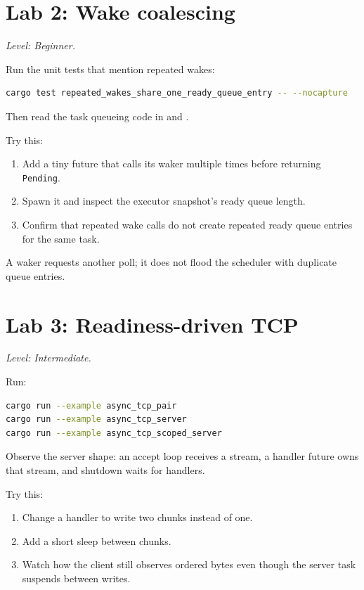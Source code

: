 \section{Lab 2: Wake coalescing}

\textit{Level: Beginner.}

Run the unit tests that mention repeated wakes:

\begin{lstlisting}[language=bash,caption={Wake tests}]
cargo test repeated_wakes_share_one_ready_queue_entry -- --nocapture
\end{lstlisting}

Then read the task queueing code in
 and
.

Try this:

\begin{enumerate}
    \item Add a tiny future that calls its waker multiple times before
          returning \texttt{Pending}.
    \item Spawn it and inspect the executor snapshot's ready queue length.
    \item Confirm that repeated wake calls do not create repeated ready queue
          entries for the same task.
\end{enumerate}

A waker requests another poll; it does not flood the scheduler
with duplicate queue entries.

\section{Lab 3: Readiness-driven TCP}

\textit{Level: Intermediate.}

Run:

\begin{lstlisting}[language=bash,caption={TCP readiness examples}]
cargo run --example async_tcp_pair
cargo run --example async_tcp_server
cargo run --example async_tcp_scoped_server
\end{lstlisting}

Observe the server shape: an accept loop receives a stream, a handler future
owns that stream, and shutdown waits for handlers.

Try this:

\begin{enumerate}
    \item Change a handler to write two chunks instead of one.
    \item Add a short sleep between chunks.
    \item Watch how the client still observes ordered bytes even though the
          server task suspends between writes.
\end{enumerate}

